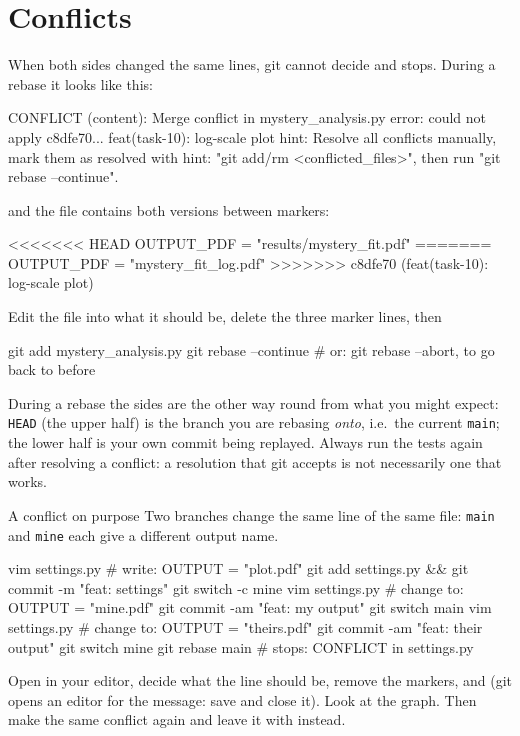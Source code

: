 \section{Conflicts}

When both sides changed the same lines, git cannot decide and stops. During a
rebase it looks like this:

\begin{outputlisting}
CONFLICT (content): Merge conflict in mystery_analysis.py
error: could not apply c8dfe70... feat(task-10): log-scale plot
hint: Resolve all conflicts manually, mark them as resolved with
hint: "git add/rm <conflicted_files>", then run "git rebase --continue".
\end{outputlisting}

and the file contains both versions between markers:

\begin{outputlisting}
<<<<<<< HEAD
OUTPUT_PDF = "results/mystery_fit.pdf"
=======
OUTPUT_PDF = "mystery_fit_log.pdf"
>>>>>>> c8dfe70 (feat(task-10): log-scale plot)
\end{outputlisting}

Edit the file into what it should be, delete the three marker lines, then
\begin{shell}
git add mystery_analysis.py
git rebase --continue          # or: git rebase --abort, to go back to before
\end{shell}

\begin{pitfall}
During a rebase the sides are the other way round from what you might expect:
\texttt{HEAD} (the upper half) is the branch you are rebasing \emph{onto},
i.e.\ the current \texttt{main}; the lower half is your own commit being
replayed. Always run the tests again after resolving a conflict: a resolution
that git accepts is not necessarily one that works.
\end{pitfall}

\begin{exercise}{A conflict on purpose}
Two branches change the same line of the same file: \texttt{main} and
\texttt{mine} each give  a different output name.
\begin{shell}
vim settings.py                # write: OUTPUT = "plot.pdf"
git add settings.py && git commit -m "feat: settings"
git switch -c mine
vim settings.py                # change to: OUTPUT = "mine.pdf"
git commit -am "feat: my output"
git switch main
vim settings.py                # change to: OUTPUT = "theirs.pdf"
git commit -am "feat: their output"
git switch mine
git rebase main                # stops: CONFLICT in settings.py
\end{shell}
Open  in your editor, decide what the line should be, remove the markers,
 and  (git opens an
editor for the message: save and close it). Look at the graph. Then make the
same conflict again and leave it with  instead.
\end{exercise}

